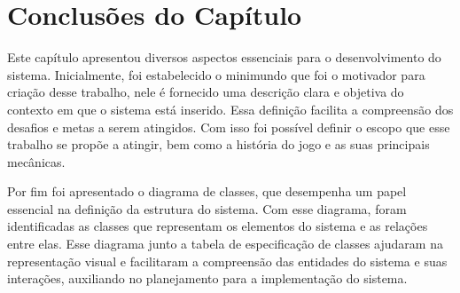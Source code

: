 \clearpage
\section{Conclusões do Capítulo}
\label{sec:conclusoes-do-capitulo-3}
Este capítulo apresentou diversos aspectos essenciais para o desenvolvimento do sistema. Inicialmente, foi estabelecido o minimundo que foi o motivador para criação desse trabalho, nele é fornecido uma descrição clara e objetiva do contexto em que o sistema está inserido. Essa definição facilita a compreensão dos desafios e metas a serem atingidos. Com isso foi possível definir o escopo que esse trabalho se propõe a atingir, bem como a história do jogo e as suas principais mecânicas.  

Por fim foi apresentado o diagrama de classes, que desempenha um papel essencial na definição da estrutura do sistema. Com esse diagrama, foram identificadas as classes que representam os elementos do sistema e as relações entre elas. Esse diagrama junto a tabela de especificação de classes ajudaram na representação visual e facilitaram a compreensão das entidades do sistema e suas interações, auxiliando no planejamento para a implementação do sistema.

